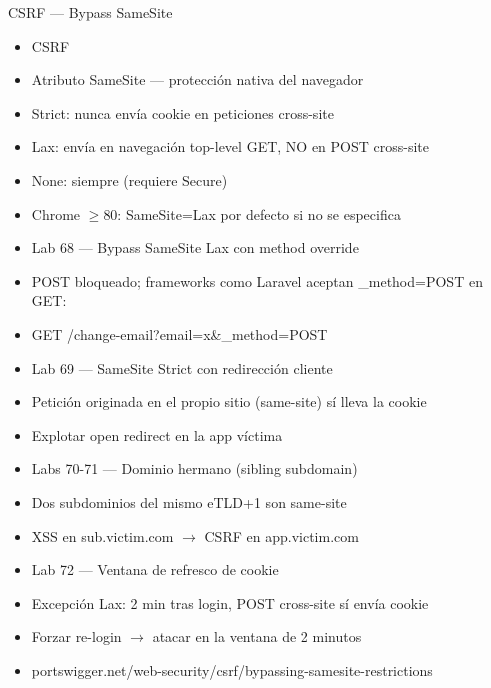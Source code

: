 \documentclass[aspectratio=169,10pt]{beamer}
\newcommand{\cmdbox}[1]{%
  \begin{center}%
  {\setlength{\fboxsep}{6pt}\colorbox{uzlav!40}{\parbox{0.88\linewidth}{\ttfamily\footnotesize #1}}}%
  \end{center}}
\begin{document}
\begin{frame}[allowframebreaks]{CSRF --- Bypass SameSite}
\small
  \begin{itemize}
  \item CSRF
  \item Atributo SameSite --- protección nativa del navegador
  \item Strict: nunca envía cookie en peticiones cross-site
  \item Lax: envía en navegación top-level GET, NO en POST cross-site
  \item None: siempre (requiere Secure)
  \item Chrome $\geq$80: SameSite=Lax por defecto si no se especifica
  \item Lab 68 --- Bypass SameSite Lax con method override
  \item POST bloqueado; frameworks como Laravel aceptan \_method=POST en GET:
  \item[] \cmdbox{GET /change-email?email=x\&\_method=POST}
  \item Lab 69 --- SameSite Strict con redirección cliente
  \item Petición originada en el propio sitio (same-site) sí lleva la cookie
  \item Explotar open redirect en la app víctima
  \item Labs 70-71 --- Dominio hermano (sibling subdomain)
  \item Dos subdominios del mismo eTLD+1 son same-site
  \item XSS en sub.victim.com $\rightarrow$ CSRF en app.victim.com
  \item Lab 72 --- Ventana de refresco de cookie
  \item Excepción Lax: 2 min tras login, POST cross-site sí envía cookie
  \item Forzar re-login $\rightarrow$ atacar en la ventana de 2 minutos
  \item portswigger.net/web-security/csrf/bypassing-samesite-restrictions
  \end{itemize}
\end{frame}
\end{document}
